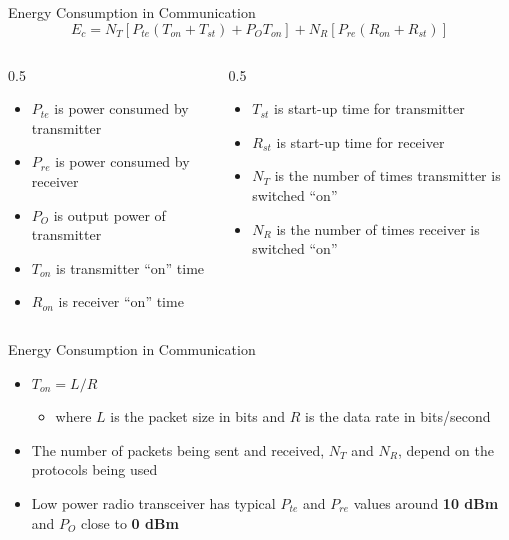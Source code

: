 \documentclass[aspectratio=169,11pt]{beamer}
\begin{document}
\begin{frame}{Energy Consumption in Communication}
    \[
    E_c = N_T[P_{te}(T_{on} + T_{st}) + P_O T_{on}] + N_R[P_{re}(R_{on} + R_{st})]
    \]
    
    \vspace{0.3cm}
    \begin{columns}
        \begin{column}{0.5\textwidth}
            \begin{itemize}
                \item $P_{te}$ is power consumed by transmitter
                \item $P_{re}$ is power consumed by receiver
                \item $P_O$ is output power of transmitter
                \item $T_{on}$ is transmitter ``on'' time
                \item $R_{on}$ is receiver ``on'' time
            \end{itemize}
        \end{column}
        \begin{column}{0.5\textwidth}
            \begin{itemize}
                \item $T_{st}$ is start-up time for transmitter
                \item $R_{st}$ is start-up time for receiver
                \item $N_T$ is the number of times transmitter is switched ``on''
                \item $N_R$ is the number of times receiver is switched ``on''
            \end{itemize}
        \end{column}
    \end{columns}
\end{frame}

\begin{frame}{Energy Consumption in Communication}
    \begin{itemize}
        \item $T_{on} = L / R$
        \begin{itemize}
            \item where $L$ is the packet size in bits and $R$ is the data rate in bits/second
        \end{itemize}
        \item The number of packets being sent and received, $N_T$ and $N_R$, depend on the protocols being used
        \item Low power radio transceiver has typical $P_{te}$ and $P_{re}$ values around \textbf{10 dBm} and $P_O$ close to \textbf{0 dBm}
    \end{itemize}
\end{frame}
\end{document}
